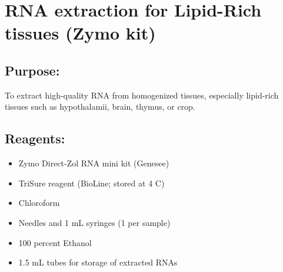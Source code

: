 \documentclass[a4paper,12pt,twoside]{book}
\begin{document}
	\thispagestyle{fancy}%
\section*{RNA extraction for Lipid-Rich tissues (Zymo kit)}
	
 \subsection*{Purpose:}
To extract high-quality RNA from homogenized tissues, especially lipid-rich tissues such as hypothalamii, brain, thymus, or crop.

\subsection*{Reagents:}
\begin{itemize}
	\item Zymo Direct-Zol RNA mini kit (Genesee)
	\item TriSure reagent (BioLine; stored at 4 C)
	\item Chloroform
	\item Needles and 1 mL syringes (1 per sample)
	\item 100 percent Ethanol
	\item 1.5 mL tubes for storage of extracted RNAs
\end{itemize}
\end{document}
